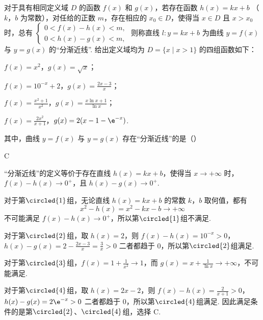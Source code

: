 \begin{problem}
对于具有相同定义域 \(D\) 的函数 \(f(x)\) 和 \(g(x)\)，若存在函数 \(h(x) = kx + b\) （\(k\)，\(b\) 为常数），对任给的正数 \(m\)，存在相应的 \(x_0 \in D\)，使得当 \(x \in D\) 且 \(x > x_0\) 时，总有 \(\begin{cases}
0 < f(x) - h(x) < m,\\
0 < h(x) - g(x) < m,
\end{cases}\) 则称直线 \(l: y = kx + b\) 为曲线 \(y = f(x)\) 与 \(y = g(x)\) 的“分渐近线”. 给出定义域均为 \(D = \{x \mid x > 1\}\) 的四组函数如下：
\begin{circlelist}
\item \(f(x)=x^{2}\)，\(g(x) = \sqrt{x}\)；
\item \(f(x) = 10^{-x} + 2\)，\(g(x) = \frac{2x - 3}{x}\)；
\item \(f(x) = \frac{x^2 + 1}{x^2}\)，\(g(x) = \frac{x\ln x + 1}{\ln x}\)；
\item \(f(x) = \frac{2x^2}{x + 1}\)，\(g(x) = 2(x - 1 - \e^{-x})\).
\end{circlelist}
其中，曲线 \( y = f(x) \) 与 \( y = g(x) \) 存在“分渐近线”的是（\quad）
\choices
    {}
    {}
    {}
    {}
\end{problem}

\begin{answer}
C
\end{answer}

\begin{solution}
“分渐近线”的定义等价于存在直线 \(h(x)=kx+b\)，使得当 \(x\to+\infty\) 时，\(f(x)-h(x)\to0^{+}\)，且 \(h(x)-g(x)\to0^{+}\).

对于第\(\circled{1}\)组，无论直线 \(h(x)=kx+b\) 的常数 \(k\)，\(b\) 取何值，都有
\[
x^{2}-h(x)=x^{2}-kx-b\longrightarrow+\infty
\]
不可能满足 \(f(x)-h(x)\to0^{+}\)，所以第\(\circled{1}\)组不满足.

对于第\(\circled{2}\)组，取 \(h(x)=2\)，则
\(f(x)-h(x)=10^{-x}>0\)，\(h(x)-g(x)=2-\frac{2x-3}{x}=\frac{3}{x}>0\)
二者都趋于 \(0\)，所以第\(\circled{2}\)组满足.

对于第\(\circled{3}\)组，\(f(x)=1+\frac{1}{x^{2}}\to1\)，而 \(g(x)=x+\frac{1}{\ln x}\to+\infty\)，不可能满足.

对于第\(\circled{4}\)组，取 \(h(x)=2x-2\)，则
\(f(x)-h(x)=\frac{2}{x+1}>0\)，\(h(x)-g(x)=2\e^{-x}>0\)
二者都趋于 \(0\)，所以第\(\circled{4}\)组满足. 因此满足条件的是第\(\circled{2}\)、\(\circled{4}\)组，选择 C.
\end{solution}

